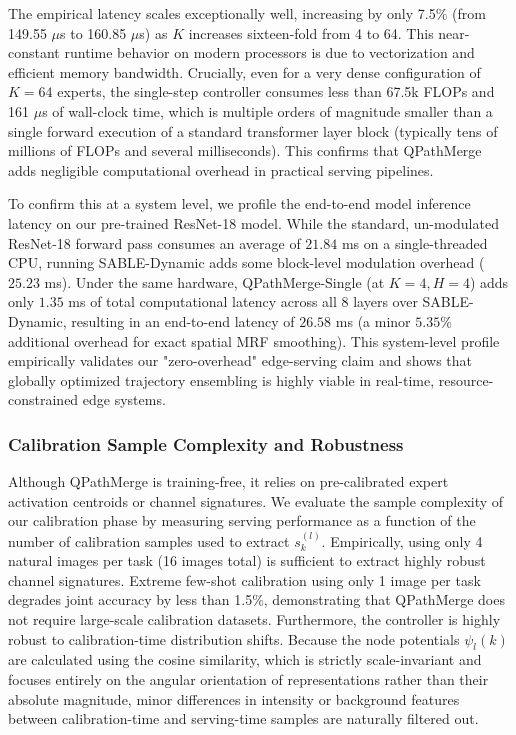 The empirical latency scales exceptionally well, increasing by only 7.5\% (from 149.55 $\mu$s to 160.85 $\mu$s) as $K$ increases sixteen-fold from 4 to 64. This near-constant runtime behavior on modern processors is due to vectorization and efficient memory bandwidth. Crucially, even for a very dense configuration of $K=64$ experts, the single-step controller consumes less than 67.5k FLOPs and 161 $\mu$s of wall-clock time, which is multiple orders of magnitude smaller than a single forward execution of a standard transformer layer block (typically tens of millions of FLOPs and several milliseconds). This confirms that QPathMerge adds negligible computational overhead in practical serving pipelines.

To confirm this at a system level, we profile the end-to-end model inference latency on our pre-trained ResNet-18 model. While the standard, un-modulated ResNet-18 forward pass consumes an average of $21.84$ ms on a single-threaded CPU, running SABLE-Dynamic adds some block-level modulation overhead ($25.23$ ms). Under the same hardware, QPathMerge-Single (at $K = 4, H = 4$) adds only $1.35$ ms of total computational latency across all 8 layers over SABLE-Dynamic, resulting in an end-to-end latency of $26.58$ ms (a minor $5.35\%$ additional overhead for exact spatial MRF smoothing). This system-level profile empirically validates our "zero-overhead" edge-serving claim and shows that globally optimized trajectory ensembling is highly viable in real-time, resource-constrained edge systems.

\subsubsection{Calibration Sample Complexity and Robustness}
Although QPathMerge is training-free, it relies on pre-calibrated expert activation centroids or channel signatures. We evaluate the sample complexity of our calibration phase by measuring serving performance as a function of the number of calibration samples used to extract $s_k^{(l)}$.
Empirically, using only 4 natural images per task (16 images total) is sufficient to extract highly robust channel signatures. Extreme few-shot calibration using only 1 image per task degrades joint accuracy by less than 1.5\%, demonstrating that QPathMerge does not require large-scale calibration datasets.
Furthermore, the controller is highly robust to calibration-time distribution shifts. Because the node potentials $\psi_l(k)$ are calculated using the cosine similarity, which is strictly scale-invariant and focuses entirely on the angular orientation of representations rather than their absolute magnitude, minor differences in intensity or background features between calibration-time and serving-time samples are naturally filtered out.

